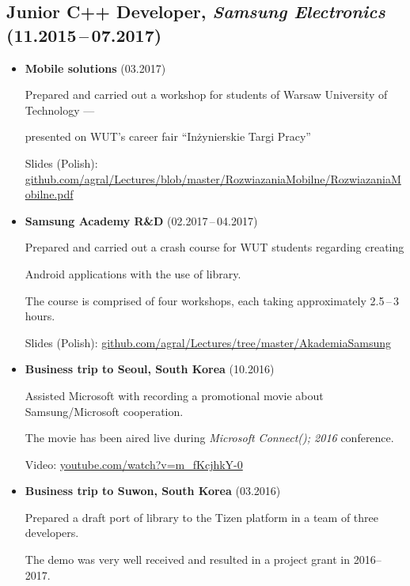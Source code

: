 \documentclass[a4paper,10pt]{article}
\begin{document}
\subsection{Junior C++ Developer, \textit{Samsung Electronics} \hfill (11.2015\,--\,07.2017)}
\begin{itemize}[leftmargin=15pt,itemsep=3pt]
  \item {\bfseries Mobile solutions} \hfill{} (03.2017) \par
  Prepared and carried out a workshop for students of Warsaw University of Technology --- \par
  presented on WUT's career fair ``Inżynierskie Targi Pracy'' \par
  Slides (Polish):
  \href{https://github.com/agral/Lectures/blob/master/RozwiazaniaMobilne/RozwiazaniaMobilne.pdf}
  {github.com/agral/Lectures/blob/master/RozwiazaniaMobilne/RozwiazaniaMobilne.pdf}\par

  \item {\bfseries Samsung Academy R\&D} \hfill{} (02.2017\,--\,04.2017) \par
  Prepared and carried out a crash course for WUT students regarding creating\par
  Android applications with the use of  library.\par
  The course is comprised of four workshops, each taking approximately 2.5\,--\,3 hours.\par
  Slides (Polish): \href{https://github.com/agral/Lectures/tree/master/AkademiaSamsung}
  {github.com/agral/Lectures/tree/master/AkademiaSamsung}\par


  \item {\bfseries Business trip to Seoul, South Korea} \hfill{} (10.2016) \par
  Assisted Microsoft with recording a promotional movie about Samsung/Microsoft cooperation.\par
  The movie has been aired live during \textit{Microsoft Connect(); 2016} conference.\par
  Video: \href{https://www.youtube.com/watch?v=m_fKcjhkY-0}{youtube.com/watch?v=m\_fKcjhkY-0}\par

  \item {\bfseries Business trip to Suwon, South Korea} \hfill{} (03.2016) \par
  Prepared a draft port of  library to the Tizen platform in a team of three developers.\par
  The demo was very well received and resulted in a project grant in 2016--2017.\par


\end{itemize}
\end{document}
